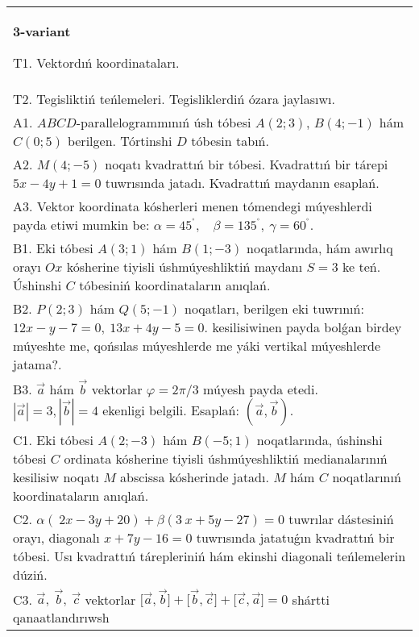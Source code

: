 \documentclass{article}
\begin{document}
\begin{tabular}{m{17cm}}
\textbf{3-variant}
\newline

T1. 
Vektordıń koordinataları.
 \\
T2. 
Tegisliktiń teńlemeleri. Tegisliklerdiń ózara jaylasıwı.
 \\
A1. 
$ABCD$-parallelogrammınıń úsh tóbesi
$A(2;3)$, $B(4;-1)$ hám $C(0;5)$ berilgen. Tórtinshi $D$
tóbesin tabıń.
 \\
A2. 
$M(4;-5)$ noqatı kvadrattıń bir tóbesi. 
Kvadrattıń bir tárepi $5x-4y+1=0$ tuwrısında jatadı. 
Kvadrattıń maydanın esaplań.
 \\
A3. 
Vektor koordinata kósherleri menen tómendegi múyeshlerdi payda etiwi mumkin be:
$\alpha = 45^{{^\circ}},\ \ \ \ \beta = 135^{{^\circ}},\ \gamma = 60^{{^\circ}}$.
 \\
B1. 
Eki tóbesi \(A(3;1)\) hám \(B(1;-3)\) noqatlarında, hám
awırlıq orayı $Ox$ kósherine tiyisli úshmúyeshliktiń maydanı
\(S=3\) ke teń. Úshinshi $C$ tóbesiniń koordinataların anıqlań. \\
B2. 
\(P(2;3)\) hám \(Q(5;-1)\) noqatları, berilgen eki
tuwrınıń: $12x-y-7=0,\ 13x+4y-5=0$.
kesilisiwinen payda bolǵan birdey múyeshte me, qońsılas múyeshlerde me yáki vertikal
múyeshlerde jatama?.
 \\
B3. 
$\vec{a}$ hám $\vec{b}$ vektorlar $\varphi = 2\pi/3$ múyesh payda etedi. $|\vec{a}| = 3,|\vec{b}| = 4$ ekenligi belgili. Esaplań: 
$\left(\vec{a},\vec{b} \right)$.
 \\
C1. 
Eki tóbesi \(A(2; - 3)\) hám \(B( - 5;1)\) noqatlarında,
úshinshi tóbesi $C$ ordinata kósherine tiyisli úshmúyeshliktiń
medianalarınıń kesilisiw noqatı $M$ abscissa kósherinde jatadı.
$M$ hám $C$ noqatlarınıń koordinataların anıqlań.
 \\
C2. 
\(\alpha (\ 2x - 3y + 20) + \beta(3\ x + 5y - 27) = 0\) tuwrılar
dástesiniń orayı, diagonalı \(x + 7y - 16 = 0\) tuwrısında jatatuǵın
kvadrattıń bir tóbesi. Usı kvadrattıń tárepleriniń hám ekinshi diagonali
teńlemelerin dúziń.
 \\
C3. 
\(\vec{a},\ \vec{b},\ \vec{c}\) vektorlar \(\lbrack\vec{a},\vec{b}\rbrack + \lbrack\vec{b},\vec{c}\rbrack + \lbrack\vec{c},\vec{a}\rbrack = 0\) shártti qanaatlandırıwsh
 \\

\end{tabular}
\vspace{1cm}
\end{document}
